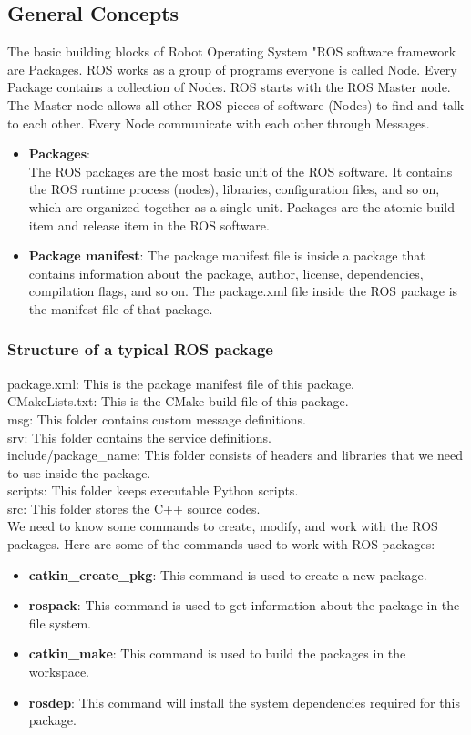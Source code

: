  \subsection{General Concepts}
 	The basic building blocks of Robot Operating System "ROS software framework are Packages. ROS works as a group of programs everyone is called Node. Every Package contains a collection of Nodes. ROS starts with the ROS Master node. The Master node allows all other ROS pieces of software (Nodes) to find and talk to each other. Every Node communicate with each other through Messages.
 	\begin{itemize}
 		\item \textbf{Packages}:\\
 		 The ROS packages are the most basic unit of the ROS software. It contains the ROS runtime process (nodes), libraries, configuration files, and so on, which are organized together as a single unit. Packages are the atomic build item and release item in the ROS software. 
 		 \item \textbf{Package manifest}: The package manifest file is inside a package that contains information about the package, author, license, dependencies, compilation flags, and so on. The package.xml file inside the ROS package is the manifest file of that package.
 	\end{itemize}
 	
	\subsubsection{Structure of a typical ROS package}
	package.xml: This is the package manifest file of this package.\\
    CMakeLists.txt: This is the CMake build file of this package.\\
    msg: This folder contains custom message definitions.\\
    srv: This folder contains the service definitions. \\
    include/package\_name: This folder consists of headers and libraries that we need to use inside the package. \\
    scripts: This folder keeps executable Python scripts. \\
    src: This folder stores the C++ source codes.\\
    We need to know some commands to create, modify, and work with the ROS packages.
    Here are some of the commands used to work with ROS packages:
    \begin{itemize}
    	\item \textbf{catkin\_create\_pkg}: This command is used to create a new package.
    	\item \textbf{rospack}: This command is used to get information about the package in the file system.
    	\item \textbf{catkin\_make}: This command is used to build the packages in the workspace.
    	\item \textbf{rosdep}: This command will install the system dependencies required for this package.
    \end{itemize}

